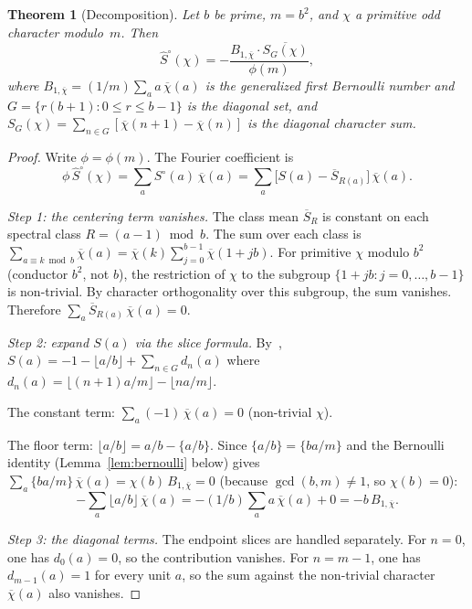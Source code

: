 \documentclass[12pt]{amsart}
\newtheorem{theorem}{Theorem}
\theoremstyle{definition}
\theoremstyle{remark}
\begin{document}
\begin{theorem}[Decomposition]\label{thm:decompose}
Let $b$ be prime, $m = b^2$, and $\chi$ a primitive
odd character modulo~$m$. Then
\[
\hat{S}^{\circ}(\chi)
= -\frac{B_{1,\overline{\chi}} \cdot
\overline{S_G(\chi)}}{\phi(m)},
\]
where
$B_{1,\overline{\chi}} = (1/m) \sum_{a} a\,
\overline{\chi}(a)$ is the generalized first Bernoulli
number and
$G = \{r(b{+}1) : 0 \le r \le b{-}1\}$ is the diagonal
set, and
$S_G(\chi) = \sum_{n \in G}
[\overline{\chi}(n{+}1) - \overline{\chi}(n)]$
is the diagonal character sum.
\end{theorem}

\begin{proof}
Write $\phi = \phi(m)$. The Fourier coefficient is
\[
\phi\, \hat{S}^{\circ}(\chi)
= \sum_a S^{\circ}(a)\, \overline{\chi}(a)
= \sum_a \bigl[S(a) - \overline{S}_{R(a)}\bigr]\,
\overline{\chi}(a).
\]

\emph{Step 1: the centering term vanishes.}
The class mean $\overline{S}_{R}$ is constant on
each spectral class $R = (a{-}1) \bmod b$. The sum
over each class is
$\sum_{a \equiv k \bmod b} \overline{\chi}(a)
= \overline{\chi}(k) \sum_{j=0}^{b-1}
\overline{\chi}(1 + jb)$.
For primitive $\chi$ modulo $b^2$ (conductor $b^2$,
not $b$), the restriction of $\chi$ to the subgroup
$\{1 + jb : j = 0, \ldots, b{-}1\}$ is non-trivial.
By character orthogonality over this subgroup, the
sum vanishes. Therefore
$\sum_a \overline{S}_{R(a)}\, \overline{\chi}(a) = 0$.

\emph{Step 2: expand $S(a)$ via the slice formula.}
By~\cite{paperA},
$S(a) = -1 - \lfloor a/b \rfloor
+ \sum_{n \in G} d_n(a)$
where $d_n(a) = \lfloor(n{+}1)a/m\rfloor
- \lfloor na/m \rfloor$.

The constant term: $\sum_a (-1)\, \overline{\chi}(a)
= 0$ (non-trivial $\chi$).

The floor term: $\lfloor a/b \rfloor = a/b - \{a/b\}$.
Since $\{a/b\} = \{ba/m\}$ and the Bernoulli identity
(Lemma~\ref{lem:bernoulli} below) gives
$\sum_a \{ba/m\}\, \overline{\chi}(a)
= \chi(b)\, B_{1,\overline{\chi}} = 0$ (because
$\gcd(b, m) \ne 1$, so $\chi(b) = 0$):
\[
-\sum_a \lfloor a/b \rfloor\, \overline{\chi}(a)
= -(1/b) \sum_a a\, \overline{\chi}(a) + 0
= -b\, B_{1,\overline{\chi}}.
\]

\emph{Step 3: the diagonal terms.}
The endpoint slices are handled separately. For
$n = 0$, one has $d_0(a)=0$, so the contribution
vanishes. For $n = m{-}1$, one has
$d_{m-1}(a)=1$ for every unit $a$, so the sum against
the non-trivial character $\overline{\chi}(a)$ also
vanishes.


\end{proof}
\end{document}

